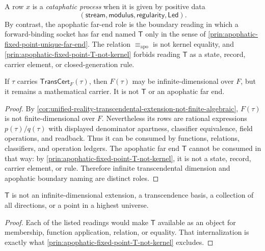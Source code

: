 \begin{definition}
\label{def:unified-reality-cataphatic-process-apophatic-far-end}
A row $x$ is a \emph{cataphatic process} when it is given by positive
data
$$
(\mathsf{stream},\mathsf{modulus},\mathsf{regularity},\mathsf{Led}).
$$
By contrast, the apophatic far-end role is the boundary reading in
which a forward-binding socket has far end named $\mathsf{T}$ only in
the sense of
\autoref{prin:apophatic-fixed-point-unique-far-end}. The relation
$\equiv_{\mathrm{apo}}$ is not kernel equality, and
\autoref{prin:apophatic-fixed-point-T-not-kernel} forbids reading
$\mathsf{T}$ as a state, record, carrier element, or closed-generation
rule.
\end{definition}

\begin{theorem}
\label{thm:unified-reality-transcendental-carrier-not-apophatic-far-end}
If $\tau$ carries $\mathsf{TransCert}_F(\tau)$, then $F(\tau)$ may be
infinite-dimensional over $F$, but it remains a mathematical carrier.
It is not $\mathsf{T}$ or an apophatic far end.
\end{theorem}

\begin{proof}
By
\autoref{cor:unified-reality-transcendental-extension-not-finite-algebraic},
$F(\tau)$ is not finite-dimensional over $F$. Nevertheless its rows are
rational expressions $p(\tau)/q(\tau)$ with displayed denominator
apartness, classifier equivalence, field operations, and readback. Thus
it can be consumed by functions, relations, classifiers, and operation
ledgers. The apophatic far end $\mathsf{T}$ cannot be consumed in that
way: by \autoref{prin:apophatic-fixed-point-T-not-kernel}, it is not a
state, record, carrier element, or rule. Therefore infinite
transcendental dimension and apophatic boundary naming are distinct
roles.
\end{proof}

\begin{corollary}
\label{cor:unified-reality-far-end-not-highest-dimensional-object}
$\mathsf{T}$ is not an infinite-dimensional extension, a transcendence
basis, a collection of all directions, or a point in a highest universe.
\end{corollary}

\begin{proof}
Each of the listed readings would make $\mathsf{T}$ available as an
object for membership, function application, relation, or equality.
That internalization is exactly what
\autoref{prin:apophatic-fixed-point-T-not-kernel} excludes.
\end{proof}

